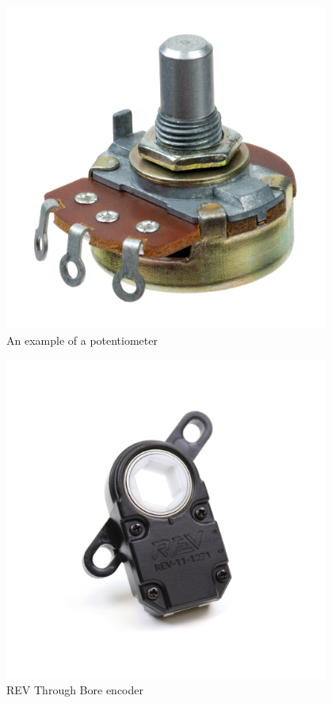 \begin{figure}[htp]
\centering
\includegraphics[width=0.95\textwidth, angle=0]{Meetings/February/02-17-22/02-17-22 1.jpg}
\caption{An example of a potentiometer}
\label{fig:021722_1}
\end{figure}

\begin{figure}[htp]
\centering
\includegraphics[width=0.95\textwidth, angle=0]{Meetings/February/02-17-22/02-17-22 2.PNG}
\caption{REV Through Bore encoder}
\label{fig:021722_2}
\end{figure}



